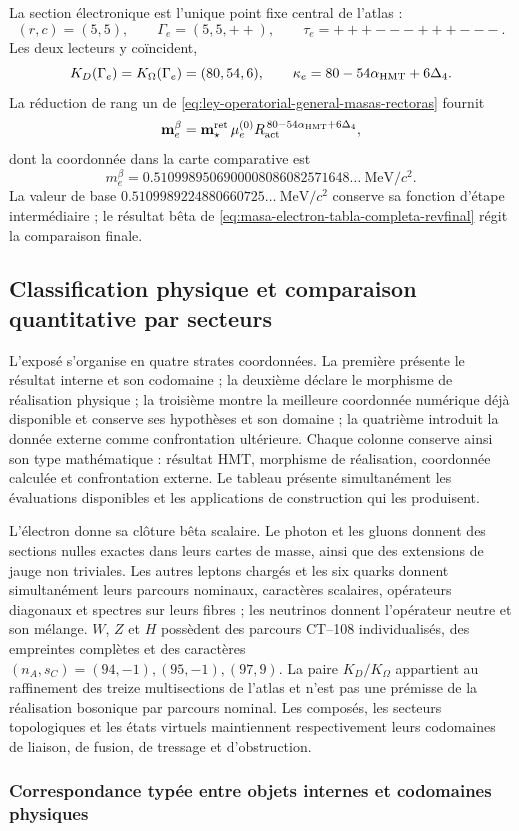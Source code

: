 La section électronique est l'unique point fixe central de l'atlas :
\begin{equation}
 (r,c)=(5,5),\qquad
 \Gamma_e=(5,5,++),\qquad
 \tau_e=\mathtt{+++---+++---}.
 \label{eq:ruta-electronica-central-masas-rectoras}
\end{equation}
Les deux lecteurs y coïncident,
\begin{equation}
 K_D(\Gamma_e)=K_\Omega(\Gamma_e)=(80,54,6),\qquad
 \kappa_e=80-54\alpha_{\rm HMT}+6\Delta_4.
 \label{eq:kappa-electron-rector}
\end{equation}
La réduction de rang un de
\eqref{eq:ley-operatorial-general-masas-rectoras} fournit
\begin{equation}
 \mathbf m_e^\beta
 =\mathbf m_\star^{\rm ret}\,
   \mu_e^{(0)}R_{\rm act}^{\,80-54\alpha_{\rm HMT}+6\Delta_4},
 \label{eq:electron-rank1-ley-masas}
\end{equation}
dont la coordonnée dans la carte comparative est
\begin{equation}
 \boxed{m_e^\beta
 =0.5109989506900008086082571648\ldots\ \mathrm{MeV}/c^2.}
 \label{eq:masa-electron-tabla-completa-revfinal}
\end{equation}
La valeur de base
\(0.5109989224880660725\ldots\ \mathrm{MeV}/c^2\) conserve sa fonction
d'étape intermédiaire ; le résultat bêta de
\eqref{eq:masa-electron-tabla-completa-revfinal} régit la comparaison finale.

\subsection{Classification physique et comparaison quantitative par secteurs}

L'exposé s'organise en quatre strates coordonnées. La première présente le
résultat interne et son codomaine ; la deuxième déclare le morphisme de réalisation
physique ; la troisième montre la meilleure coordonnée numérique déjà disponible et conserve
ses hypothèses et son domaine ; la quatrième introduit la donnée externe comme confrontation ultérieure.
Chaque colonne conserve ainsi son type mathématique : résultat HMT, morphisme de
réalisation, coordonnée calculée et confrontation externe. Le tableau présente
simultanément les évaluations disponibles et les applications de construction qui les
produisent.

L'électron donne sa clôture bêta scalaire. Le photon et les gluons donnent
des sections nulles exactes dans leurs cartes de masse, ainsi que des extensions de jauge non
triviales. Les autres leptons chargés et les six quarks donnent simultanément
leurs parcours nominaux, caractères scalaires, opérateurs diagonaux et spectres sur
leurs fibres ; les neutrinos donnent l'opérateur neutre et son mélange. \(W\), \(Z\) et
\(H\) possèdent des parcours CT--108 individualisés, des empreintes complètes et des caractères
\((n_A,s_C)=(94,-1),(95,-1),(97,9)\). La paire \(K_D/K_\Omega\) appartient au
raffinement des treize multisections de l'atlas et n'est pas une prémisse de la
réalisation bosonique par parcours nominal. Les composés, les secteurs topologiques et les états
virtuels maintiennent respectivement leurs codomaines de liaison, de fusion, de tressage
et d'obstruction.

\subsubsection{Correspondance typée entre objets internes et codomaines physiques}

